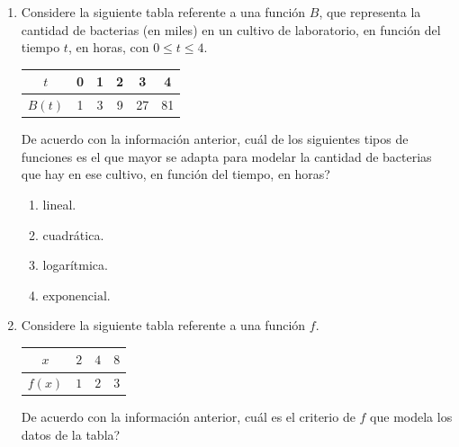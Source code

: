 \documentclass[11pt]{article}
\newcommand{\opcion}[2]{\item $#2$}
\begin{document}
\begin{enumerate}[label=\textbf{\arabic*.}, itemsep=2.5cm]
\begin{enumerate}[label=\Alph*)]
  \item cuadr\'atica.
  \opcion{B}{\mbox{lineal.}}
  \item exponencial.
  \item logar\'itmica.
\end{enumerate}

\Needspace{0.42\textheight}
\item
Considere la siguiente tabla referente a una funci\'on $B$, que representa la cantidad de bacterias (en miles) en un cultivo de laboratorio, en funci\'on del tiempo $t$, en horas, con $0 \leq t \leq 4$.

\begin{center}
\renewcommand{\arraystretch}{1.3}
\begin{tabular}{|c|c|c|c|c|c|}
\hline
$t$ & 0 & 1 & 2 & 3 & 4 \\
\hline
$B(t)$ & 1 & 3 & 9 & 27 & 81 \\
\hline
\end{tabular}
\end{center}

De acuerdo con la informaci\'on anterior, \textquestiondown cu\'al de los siguientes tipos de funciones es el que mayor se adapta para modelar la cantidad de bacterias que hay en ese cultivo, en funci\'on del tiempo, en horas?

\begin{enumerate}[label=\Alph*)]
  \item lineal.
  \item cuadr\'atica.
  \item logar\'itmica.
  \opcion{D}{\mbox{exponencial.}}
\end{enumerate}

\Needspace{0.38\textheight}
\item
Considere la siguiente tabla referente a una funci\'on $f$.

\begin{center}
\renewcommand{\arraystretch}{1.3}
\begin{tabular}{|c|c|c|c|}
\hline
$x$ & $2$ & $4$ & $8$ \\
\hline
$f(x)$ & $1$ & $2$ & $3$ \\
\hline
\end{tabular}
\end{center}

De acuerdo con la informaci\'on anterior, \textquestiondown cu\'al es el criterio de $f$ que modela los datos de la tabla?


\end{enumerate}
\end{document}

